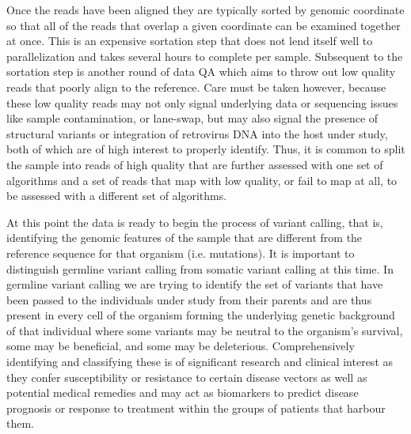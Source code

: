 Once the reads have been aligned they are typically sorted by genomic coordinate so that all of the reads that overlap a given coordinate can be examined together at once. This is an expensive sortation step that does not lend itself well to parallelization and takes several hours to complete per sample. Subsequent to the sortation step is another round of data QA which aims to throw out low quality reads that poorly align to the reference. Care must be taken however, because these low quality reads may not only signal underlying data or sequencing issues like sample contamination, or lane-swap, but may also signal the presence of structural variants or integration of retrovirus DNA into the host under study, both of which are of high interest to properly identify. Thus, it is common to split the sample into reads of high quality that are further assessed with one set of algorithms and a set of reads that map with low quality, or fail to map at all, to be assessed with a different set of algorithms.

At this point the data is ready to begin the process of variant calling, that is, identifying the genomic features of the sample that are different from the reference sequence for that organism (i.e. mutations). It is important to distinguish germline variant calling from somatic variant calling at this time. In germline variant calling we are trying to identify the set of variants that have been passed to the individuals under study from their parents and are thus present in every cell of the organism forming the underlying genetic background of that individual where some variants may be neutral to the organism's survival, some may be beneficial, and some may be deleterious. Comprehensively identifying and classifying these is of significant research and clinical interest as they confer susceptibility or resistance to certain disease vectors as well as potential medical remedies and may act as biomarkers to predict disease prognosis or response to treatment within the groups of patients that harbour them.

